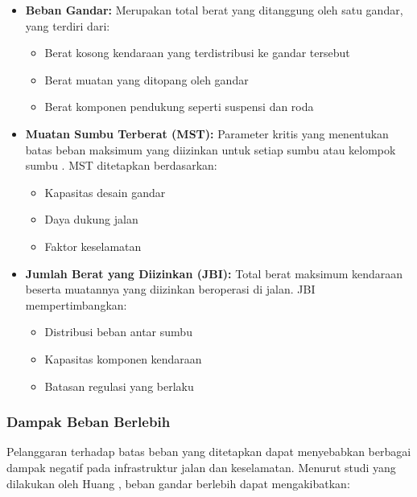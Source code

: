 \begin{itemize}[nolistsep]
  \item \textbf{Beban Gandar:} Merupakan total berat yang ditanggung oleh satu gandar, yang terdiri dari:
  \begin{itemize}[nolistsep]
    \item Berat kosong kendaraan yang terdistribusi ke gandar tersebut
    \item Berat muatan yang ditopang oleh gandar
    \item Berat komponen pendukung seperti suspensi dan roda
  \end{itemize}
  
  \item \textbf{Muatan Sumbu Terberat (MST):} Parameter kritis yang menentukan batas beban maksimum yang diizinkan untuk setiap sumbu atau kelompok sumbu \parencite*{ppno55thn2012}. MST ditetapkan berdasarkan:
  \begin{itemize}[nolistsep]
    \item Kapasitas desain gandar
    \item Daya dukung jalan
    \item Faktor keselamatan
  \end{itemize}
  
  \item \textbf{Jumlah Berat yang Diizinkan (JBI):} Total berat maksimum kendaraan beserta muatannya yang diizinkan beroperasi di jalan. JBI mempertimbangkan:
  \begin{itemize}[nolistsep]
    \item Distribusi beban antar sumbu
    \item Kapasitas komponen kendaraan
    \item Batasan regulasi yang berlaku
  \end{itemize}
\end{itemize}

\subsubsection{Dampak Beban Berlebih}
Pelanggaran terhadap batas beban yang ditetapkan dapat menyebabkan berbagai dampak negatif pada infrastruktur jalan dan keselamatan. Menurut studi yang dilakukan oleh Huang \parencite*{huang2004pavement}, beban gandar berlebih dapat mengakibatkan:

